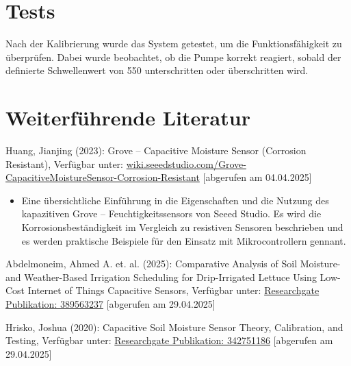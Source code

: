 		\cite{Arduino3}
		\begin{center}
			\label{Code:Anwendung}
		\end{center}


	\section{Tests}
		Nach der Kalibrierung wurde das System getestet, um die Funktionsfähigkeit zu überprüfen. Dabei wurde beobachtet, ob die Pumpe korrekt reagiert, sobald der definierte Schwellenwert von 550 unterschritten oder überschritten wird. 
		
		
	\section{Weiterführende Literatur}
		Huang, Jianjing (2023): Grove – Capacitive Moisture Sensor (Corrosion Resistant), Verfügbar unter:  \href{https://wiki.seeedstudio.com/Grove-Capacitive_Moisture_Sensor-Corrosion-Resistant}{wiki.seeedstudio.com/Grove-CapacitiveMoistureSensor-Corrosion-Resistant} [abgerufen am 04.04.2025]
		
		\begin{itemize}
			\item Eine übersichtliche Einführung in die Eigenschaften und die Nutzung des kapazitiven Grove – Feuchtigkeitssensors von Seeed Studio. Es wird die Korrosionsbeständigkeit im Vergleich zu resistiven Sensoren beschrieben und es werden praktische Beispiele für den Einsatz mit Mikrocontrollern gennant. 
		\end{itemize}

		\vspace{1\baselineskip}

		 Abdelmoneim, Ahmed A. et. al. (2025): Comparative Analysis of Soil Moisture- and Weather-Based Irrigation Scheduling for Drip-Irrigated Lettuce Using Low-Cost Internet of Things Capacitive Sensors, Verfügbar unter: \href{https://www.researchgate.net/publication/389563237}{Researchgate Publikation: 389563237}  [abgerufen am 29.04.2025] 
		 
		 \vspace{1\baselineskip}
		 		
		 Hrisko, Joshua (2020): Capacitive Soil Moisture Sensor Theory, Calibration, and Testing, Verfügbar unter: \href{https://www.researchgate.net/publication/342751186}{Researchgate Publikation: 342751186} [abgerufen am 29.04.2025]
		 

